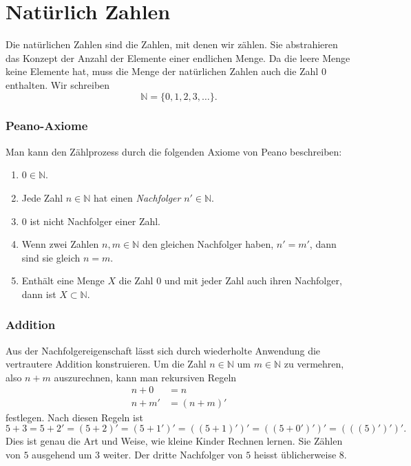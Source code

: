 %
%
%
\section{Natürlich Zahlen
\label{buch:section:natuerliche-zahlen}}
Die natürlichen Zahlen sind die Zahlen, mit denen wir zählen.
%
%
Sie abstrahieren das Konzept der Anzahl der Elemente einer endlichen
Menge.
Da die leere Menge keine Elemente hat, muss die Menge der natürlichen
Zahlen auch die Zahl $0$ enthalten.
Wir schreiben
\[
\mathbb{N}
=
\{
0,1,2,3,\dots
\}.
\]

\subsubsection{Peano-Axiome}
Man kann den Zählprozess durch die folgenden Axiome von Peano beschreiben:
%
\begin{enumerate}
\item $0\in\mathbb N$.
\item Jede Zahl $n\in \mathbb{N}$ hat einen {\em Nachfolger}
$n'\in \mathbb{N}$.
%
\item $0$ ist nicht Nachfolger einer Zahl.
\item Wenn zwei Zahlen $n,m\in\mathbb{N}$ den gleichen Nachfolger haben,
$n'=m'$, dann sind sie gleich $n=m$.
\item Enthält eine Menge $X$ die Zahl $0$ und mit jeder Zahl auch ihren
Nachfolger, dann ist $X\subset\mathbb{N}$. %
\end{enumerate}

\subsubsection{Addition}
Aus der Nachfolgereigenschaft lässt sich durch wiederholte Anwendung
die vertrautere Addition konstruieren.
%
Um die Zahl $n\in\mathbb{N}$ um $m\in\mathbb{N}$ zu vermehren, also
$n+m$ auszurechnen, kann man rekursiven Regeln
\begin{align*}
n+0&=n\\
n+m'&=(n+m)'
\end{align*}
festlegen.
Nach diesen Regeln ist
\[
5+3
=
5+2'
=
(5+2)'
=
(5+1')'
=
((5+1)')'
=
((5+0')')'
=
(((5)')')'.
\]
Dies ist genau die Art und Weise, wie kleine Kinder Rechnen lernen.
Sie Zählen von $5$ ausgehend um $3$ weiter.
Der dritte Nachfolger von $5$ heisst üblicherweise $8$.

